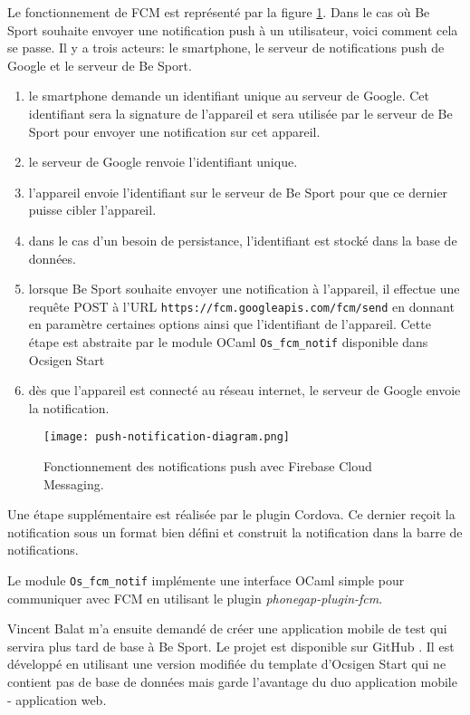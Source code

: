 Le fonctionnement de FCM est représenté par la figure
\ref{fig:push_notification_fcm_explanation}. Dans le cas où Be Sport souhaite
envoyer une notification push à un utilisateur, voici comment cela se passe.
Il y a trois acteurs: le smartphone, le serveur de notifications push de Google
et le serveur de Be Sport.

\begin{enumerate}
  \item le smartphone demande un identifiant unique au serveur de Google. Cet
    identifiant sera la signature de l'appareil et sera utilisée par le serveur
    de Be Sport pour envoyer une notification sur cet appareil.
  \item le serveur de Google renvoie l'identifiant unique.
  \item l'appareil envoie l'identifiant sur le serveur de Be Sport pour que ce
    dernier puisse cibler l'appareil.
  \item dans le cas d'un besoin de persistance, l'identifiant est stocké dans la base de données.
  \item lorsque Be Sport souhaite envoyer une notification à l'appareil, il
    effectue une requête POST à l'URL \verb|https://fcm.googleapis.com/fcm/send|
    en donnant en paramètre certaines options ainsi que l'identifiant de
    l'appareil. Cette étape est abstraite par le module OCaml
    \verb|Os_fcm_notif| disponible dans Ocsigen Start
  \item dès que l'appareil est connecté au réseau internet, le serveur de Google
    envoie la notification.
\end{enumerate}

\begin{figure}
  \centering
  \texttt{[image: push-notification-diagram.png]}
  \caption{Fonctionnement des notifications push avec Firebase Cloud Messaging.}
  \label{fig:push_notification_fcm_explanation}
\end{figure}

Une étape supplémentaire est réalisée par le plugin Cordova. Ce dernier reçoit
la notification sous un format bien défini et construit la notification dans la
barre de notifications.

Le module \verb|Os_fcm_notif| implémente une interface OCaml simple pour
communiquer avec FCM en utilisant le plugin \emph{phonegap-plugin-fcm}.

Vincent Balat m'a ensuite demandé de créer une application mobile de test qui
servira plus tard de base à Be Sport.
Le projet est disponible sur GitHub \cite{ocsigen-mobile-push-notifications}. Il
est développé en utilisant une version modifiée du template d'Ocsigen Start qui
ne contient pas de base de données mais garde l'avantage du duo application
mobile - application web.

